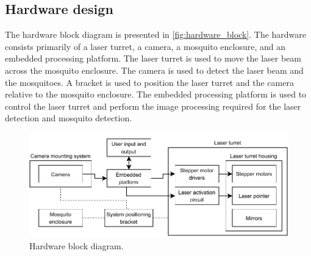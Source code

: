 \subsection{Hardware design}
The hardware block diagram is presented in \autoref{fig:hardware_block}. The hardware consists primarily of a laser turret, a camera, a mosquito enclosure, and an embedded processing platform. The laser turret is used to move the laser beam across the mosquito enclosure. The camera is used to detect the laser beam and the mosquitoes. A bracket is used to position the laser turret and the camera relative to the mosquito enclosure. The embedded processing platform is used to control the laser turret and perform the image processing required for the laser detection and mosquito detection.
\begin{figure}[h]
  \centering
  \includegraphics[width=\textwidth]{figures/hardware_block_diagram.pdf}
  \caption{Hardware block diagram.}
  \label{fig:hardware_block}
\end{figure}



